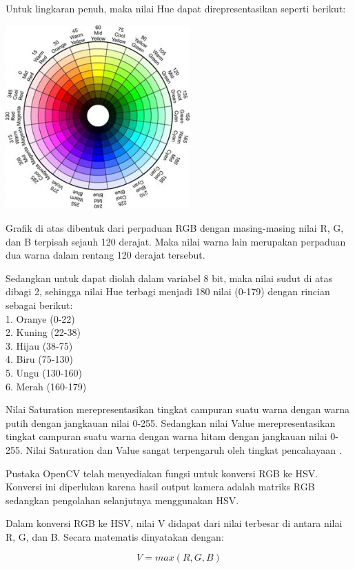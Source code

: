 \documentclass[a4paper,12pt]{article}
\begin{document}
Untuk lingkaran penuh, maka nilai Hue dapat direpresentasikan seperti berikut:
\begin{center}
 \includegraphics[width=200pt]{HSV}
\end{center}

Grafik di atas dibentuk dari perpaduan RGB dengan masing-masing nilai R, G, dan B terpisah sejauh 120 derajat.
Maka nilai warna lain merupakan perpaduan dua warna dalam rentang 120 derajat tersebut.

Sedangkan untuk dapat diolah dalam variabel 8 bit, maka nilai sudut di atas dibagi 2, sehingga nilai Hue terbagi menjadi 180 nilai (0-179) dengan rincian sebagai berikut:\\
1. Oranye (0-22)\\
2. Kuning (22-38)\\
3. Hijau (38-75)\\
4. Biru (75-130)\\
5. Ungu (130-160)\\
6. Merah (160-179)

Nilai Saturation merepresentasikan tingkat campuran suatu warna dengan warna putih dengan jangkauan nilai 0-255.
Sedangkan nilai Value merepresentasikan tingkat campuran suatu warna dengan warna hitam dengan jangkauan nilai 0-255.
Nilai Saturation dan Value sangat terpengaruh oleh tingkat pencahayaan \cite{opencv_intro} .

Pustaka OpenCV telah menyediakan fungsi untuk konversi RGB ke HSV.
Konversi ini diperlukan karena hasil output kamera adalah matriks RGB sedangkan pengolahan selanjutnya menggunakan HSV.

Dalam konversi RGB ke HSV, nilai V didapat dari nilai terbesar di antara nilai R, G, dan B. 
Secara matematis dinyatakan dengan:

\begin{equation}
  V = max(R,G,B)
\end{equation}
\end{document}
